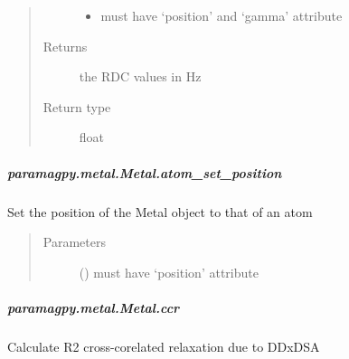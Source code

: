 \documentclass[a4paper,10pt,english,openany,oneside]{sphinxmanual}
\begin{document}
\begin{fulllineitems}
\begin{fulllineitems}
\begin{fulllineitems}
\begin{quote}
\begin{description}
\begin{itemize}
\item {} 
 \textendash{} must have ‘position’ and ‘gamma’ attribute

\end{itemize}

\item[{Returns}] \leavevmode
{} \textendash{} the RDC values in Hz

\item[{Return type}] \leavevmode
float

\end{description}\end{quote}

\end{fulllineitems}



\subparagraph{paramagpy.metal.Metal.atom\_set\_position}
\label{\detokenize{reference/generated/paramagpy.metal.Metal.atom_set_position:paramagpy-metal-metal-atom-set-position}}\label{\detokenize{reference/generated/paramagpy.metal.Metal.atom_set_position::doc}}

\begin{fulllineitems}
\label{\detokenize{reference/generated/paramagpy.metal.Metal.atom_set_position:paramagpy.metal.Metal.atom_set_position}}
Set the position of the Metal object to that of an atom
\begin{quote}\begin{description}
\item[{Parameters}] \leavevmode
{} () \textendash{} must have ‘position’ attribute

\end{description}\end{quote}

\end{fulllineitems}



\subparagraph{paramagpy.metal.Metal.ccr}
\label{\detokenize{reference/generated/paramagpy.metal.Metal.ccr:paramagpy-metal-metal-ccr}}\label{\detokenize{reference/generated/paramagpy.metal.Metal.ccr::doc}}

\begin{fulllineitems}
\label{\detokenize{reference/generated/paramagpy.metal.Metal.ccr:paramagpy.metal.Metal.ccr}}
Calculate R2 cross-corelated relaxation due to DDxDSA


\end{fulllineitems}
\end{fulllineitems}
\end{fulllineitems}
\end{document}
